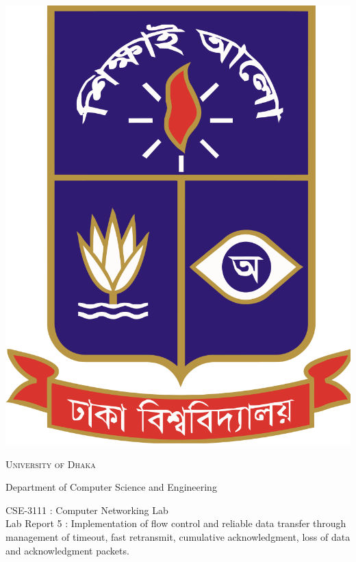 \documentclass[11pt]{article}
\begin{document}
\begin{titlepage}
    \begin{center}
        \includegraphics[scale=0.10]{du.png}\par
        \begin{Huge}
            \textsc{University of Dhaka}\par
        \end{Huge}
        \begin{Large}
            Department of Computer Science and Engineering\par \vspace{1cm}
            CSE-3111 : Computer Networking Lab \\[12pt]   
            Lab Report 5 : Implementation of flow control and reliable data transfer through management of
timeout, fast retransmit, cumulative acknowledgment, loss of data and acknowledgment packets.
        \end{Large}
    \end{center}     
    \begin{large}

\end{large}
\end{titlepage}
\end{document}
